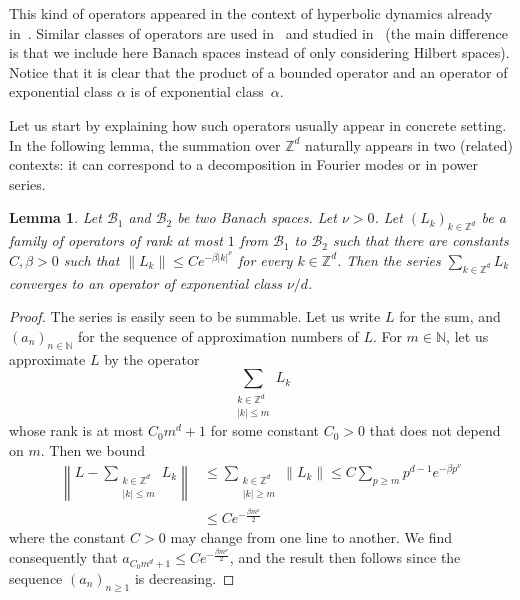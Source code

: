 \documentclass[10pt]{amsart}
\newtheorem{lemm}[theo]{Lemma}\newtheorem{prop}[theo]{Proposition}\newtheorem{coro}[theo]{Corollary}\newtheorem{conj}[theo]{Conjecture}
\theoremstyle{definition}\newtheorem{defi}[theo]{Definition}\newtheorem{rema}[theo]{Remark}\newtheorem{exam}[theo]{Example}\newtheorem{exem}[theo]{Example}\newtheorem{nota}[theo]{Notation}
\newcommand{\n}[1]{\left\|#1\right\|}
\newcommand{\clB}{\mathcal{B}}
\newcommand{\bbZ}{\mathbb{Z}}
\newcommand{\bbN}{\mathbb{N}}
\begin{document}
This kind of operators appeared in the context of hyperbolic dynamics already in~\cite{fried_selberg,fried_zeta,rugh_correlation,ruelle_zeta_expanding}. Similar classes of operators are used in~\cite{bandtlow_naud} and studied in~\cite{bandtlow_exponential} (the main difference is that we include here Banach spaces instead of only considering Hilbert spaces). Notice that it is clear that the product of a bounded operator and an operator of exponential class $\alpha$ is of exponential class~$\alpha$.

Let us start by explaining how such operators usually appear in concrete setting. In the following lemma, the summation over $\bbZ^d$ naturally appears in two (related) contexts: it can correspond to a decomposition in Fourier modes or in power series.

\begin{lemm}\label{lemma:concrete}
Let $\clB_1$ and $\clB_2$ be two Banach spaces. Let $\nu > 0$. Let $(L_k)_{k \in \bbZ^d}$ be a family of operators of rank at most $1$ from $\clB_1$ to $\clB_2$ such that there are constants $C,\beta > 0$ such that $\n{L_k} \leq C e^{- \beta |k|^\nu}$ for every $k \in \bbZ^d$. Then the series $\sum_{k \in \bbZ^d} L_k$ converges to an operator of exponential class $\nu/d$.
\end{lemm}

\begin{proof}
The series is easily seen to be summable. Let us write $L$ for the sum, and $(a_n)_{n \in \bbN}$ for the sequence of approximation numbers of $L$. For $m \in \bbN$, let us approximate $L$ by the operator
\begin{equation*}
\sum_{\substack{k \in \bbZ^d \\ |k| \leq m}} L_k
\end{equation*}
whose rank is at most $C_0 m^d+1$ for some constant $C_0 > 0$ that does not depend on $m$. Then we bound
\begin{equation*}
\begin{split}
\n{L - \sum_{\substack{k \in \bbZ^d \\ |k| \leq m}} L_k} & \leq \sum_{\substack{k \in \bbZ^d \\ |k| \geq m}} \n{L_k} \leq C \sum_{p \geq m} p^{d-1} e^{- \beta p^\nu} \\
& \leq C e^{- \frac{\beta m^{\nu}}{2}}
\end{split}
\end{equation*}
where the constant $C > 0$ may change from one line to another. We find consequently that $a_{C_0 m^d +1} \leq C e^{- \frac{\beta m^\nu}{2}}$, and the result then follows since the sequence $(a_n)_{n \geq 1}$ is decreasing.
\end{proof}
\end{document}
